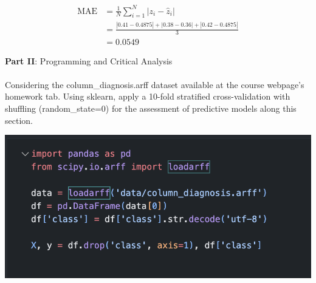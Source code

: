 \documentclass[12pt]{article}
\begin{document}
\begin{enumerate}[leftmargin=\labelsep]
\begin{enumerate}
        \begin{equation}
        \begin{split}            
            \textrm{MAE} &= \frac{1}{N}\sum_{i = 1}^N |z_i - \hat{z}_i| \\
            &=\frac{|0.41 - 0.4875| + |0.38 - 0.36| + |0.42-0.4875|}{3} \\
            &=0.0549
        \end{split}
        \end{equation}
        
    \end{enumerate}
\end{enumerate}

\vskip 1cm

\large{\textbf{Part II}: Programming and Critical Analysis}\normalsize

\paragraph{}Considering the column\_diagnosis.arff dataset available at the course webpage's homework tab.
Using sklearn, apply a 10-fold stratified cross-validation with shuffling (random\_state=0) for the
assessment of predictive models along this section.

\begin{center}
    \includegraphics[scale=0.8]{images/code2.png}
\end{center}
\end{document}
